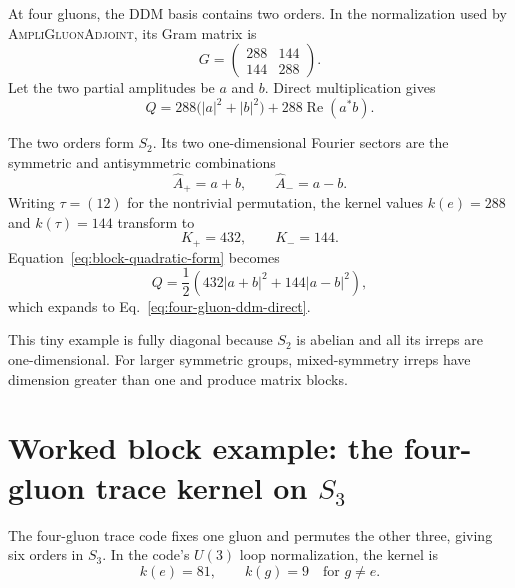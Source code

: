 \documentclass[11pt,a4paper]{article}
\begin{document}
At four gluons, the DDM basis contains two orders.  In the normalization used
by \textsc{AmpliGluonAdjoint}, its Gram matrix is
\begin{equation}
  G=\begin{pmatrix}
       288 & 144\\
       144 & 288
     \end{pmatrix}.
  \label{eq:four-gluon-ddm-gram}
\end{equation}
Let the two partial amplitudes be $a$ and $b$.  Direct multiplication gives
\begin{equation}
  Q=288\bigl(|a|^2+|b|^2\bigr)
    +288\operatorname{Re}(a^*b).
  \label{eq:four-gluon-ddm-direct}
\end{equation}

The two orders form $S_2$.  Its two one-dimensional Fourier sectors are the
symmetric and antisymmetric combinations
\begin{equation}
  \widehat A_+=a+b,
  \qquad
  \widehat A_-=a-b.
\end{equation}
Writing $\tau=(12)$ for the nontrivial permutation, the kernel values
$k(e)=288$ and $k(\tau)=144$ transform to
\begin{equation}
  K_+=432,
  \qquad
  K_-=144.
\end{equation}
Equation~\eqref{eq:block-quadratic-form} becomes
\begin{equation}
  Q=\frac{1}{2}
    \left(432|a+b|^2+144|a-b|^2\right),
  \label{eq:four-gluon-ddm-fourier}
\end{equation}
which expands to Eq.~\eqref{eq:four-gluon-ddm-direct}.

This tiny example is fully diagonal because $S_2$ is abelian and all its
irreps are one-dimensional.  For larger symmetric groups, mixed-symmetry
irreps have dimension greater than one and produce matrix blocks.

\section{Worked block example: the four-gluon trace kernel on
\texorpdfstring{$S_3$}{S3}}

The four-gluon trace code fixes one gluon and permutes the other three, giving
six orders in $S_3$.  In the code's $U(3)$ loop normalization, the kernel
is
\begin{equation}
  k(e)=81,
  \qquad
  k(g)=9\quad\text{for }g\ne e.
  \label{eq:s3-trace-kernel}
\end{equation}
\end{document}
